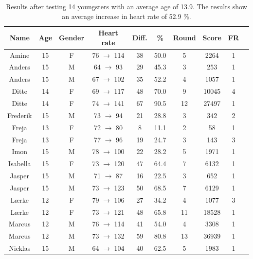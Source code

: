 \documentclass[11pt]{report}
\begin{document}
\begin{table}[H]
\centering
\caption[Test results]{Results after testing 14 youngsters with an average age of 13.9. The results show an average increase in heart rate of 52.9 \%.}
\begin{tabular}{ | c | c | c | c | c | c | c | c | c | c |}
\hline
\textbf{Name} & \textbf{Age} & \textbf{Gender} & \textbf{Heart rate} & \textbf{Diff.} & \textbf{\%} & \textbf{Round} & \textbf{Score} & \textbf{FR}\\ \hline
Amine & 15 & F & 76 $\rightarrow$ 114 & 38 & 50.0 & 5 & 2264 & 1\\ \hline 
Anders & 15 & M & 64 $\rightarrow$ 93 &  29 & 45.3 & 3 & 253 & 1\\ \hline 
Anders & 15 & M & 67 $\rightarrow$ 102  & 35 & 52.2  & 4 & 1057 & 1\\ \hline 
Ditte & 14 & F & 69 $\rightarrow$ 117 & 48  & 70.0 & 9 & 10045 & 4\\ \hline 
Ditte & 14 & F & 74 $\rightarrow$ 141 & 67 & 90.5 & 12 & 27497 & 1\\ \hline 
Frederik & 15 & M & 73 $\rightarrow$ 94 & 21 & 28.8 & 3 & 342 & 2\\ \hline 
Freja & 13 & F & 72 $\rightarrow$ 80 &  8 & 11.1 & 2 & 58 & 1\\ \hline 
Freja & 13 & F & 77 $\rightarrow$ 96 &  19 & 24.7 & 3 & 143 & 3\\ \hline 
Imon & 15 & M & 78 $\rightarrow$ 100 & 22 & 28.2 & 5 & 1971 & 1\\ \hline 
Isabella & 15 & F & 73 $\rightarrow$ 120 & 47 & 64.4 & 7 & 6132 & 1\\ \hline 
Jasper & 15 & M & 71 $\rightarrow$ 87  & 16 & 22.5 & 3 & 652 & 1\\ \hline 
Jasper & 15 & M & 73 $\rightarrow$ 123 & 50 & 68.5 & 7 & 6129 & 1\\ \hline 
L\ae rke & 12 & F & 79 $\rightarrow$ 106 & 27 & 34.2 & 4 & 1077 & 3\\ \hline 
L\ae rke & 12 & F & 73 $\rightarrow$ 121 & 48 & 65.8 & 11 & 18528 & 1\\ \hline 
Marcus & 12 & M & 76 $\rightarrow$ 114 & 41 & 54.0 & 4 & 3308 & 1\\ \hline 
Marcus & 12 & M & 73 $\rightarrow$ 132 & 59 & 80.8 & 13 & 36939 & 1\\ \hline 
Nicklas & 15 & M & 64 $\rightarrow$ 104 & 40 & 62.5 & 5 & 1983 & 1\\ \hline 

\end{tabular}
\end{table}
\end{document}

